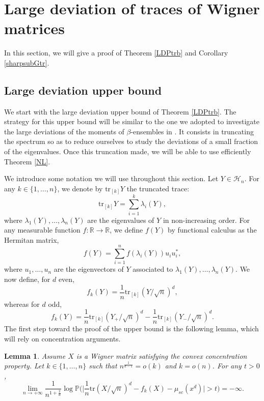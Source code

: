 \documentclass[aop,preprint]{imsart}
\newcommand\RR{\mathbb{R}}
\newcommand\PP{\mathbb{P}}
\newcommand\tr{\mathrm{tr}}
\numberwithin{equation}{section}
\theoremstyle{definition}
\theoremstyle{plain}
\newtheorem{Lem}[Def]{Lemma}
\theoremstyle{remark}
\begin{document}
 \section{Large deviation of traces of Wigner matrices}
In this section, we will give a proof of Theorem \ref{LDPtrb} and  Corollary \ref{sharpsubGtr}. 


\subsection{Large deviation upper bound}

We start with the large deviation upper bound of Theorem \ref{LDPtrb}. The  strategy for this upper bound will be similar to the one we adopted to investigate the large deviations of the moments of $\beta$-ensembles in \cite[section 3]{LDPtr}. It consists in truncating the spectrum so as to reduce ourselves to study the deviations of a small fraction of the eigenvalues. Once this truncation made, we will be able to use efficiently Theorem \ref{NL}. 


We introduce some notation we will use throughout this section. Let $Y\in \mathcal{H}_n$.  For any $k \in \{1,\ldots ,n\}$, we denote by $\tr_{[k]} Y$ the truncated trace:
\begin{equation} \label{trunctrdef} \tr_{[k]} Y = \sum_{i=1}^k \lambda_i(Y),\end{equation}
where $\lambda_1(Y),\ldots,\lambda_n(Y)$ are the eigenvalues of $Y$ in non-increasing order. For any measurable function $f : \RR \to \RR$, we define $f(Y)$ by functional calculus as the Hermitan matrix,
$$ f(Y) = \sum_{i=1}^n f(\lambda_i(Y)) u_iu_i^*,$$
where $u_1,\ldots,u_n$ are the eigenvectors of $Y$ associated to $\lambda_1(Y),\ldots, \lambda_n(Y)$.
We now define, for $d$ even,
\begin{equation}\label{trunctr} f_k(Y) =  \frac{1}{n}\tr_{[k]} (Y/\sqrt{n})^d,\end{equation}
whereas for $d$ odd,
$$ f_k(Y) = \frac{1}{n}\tr_{[k]} (Y_+/\sqrt{n})^d - \frac{1}{n}\tr_{[k]} (Y_-/\sqrt{n})^d.$$
The first step toward the proof of the upper bound is the following lemma, which will rely on concentration arguments.
\begin{Lem}\label{equivexpo}Assume $X$ is a Wigner matrix satisfying the convex concentration property.
Let $k\in \{1,\ldots,n\}$ such that $n^{\frac{1}{d-1}} = o(k)$ and $k=o(n)$. For any $t>0$,
$$\lim_{n\to +\infty} \frac{1}{n^{1+\frac{2}{d}} } \log \PP \Big( \big|\frac{1}{n}\tr (X/\sqrt{n})^d - f_{k}(X)- \mu_{sc}(x^d) \big| >t \Big) = - \infty.$$



\end{Lem}
\end{document}
